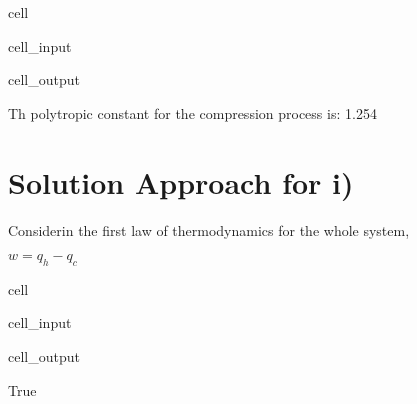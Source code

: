 \documentclass[letterpaper,10pt,english]{jupyterBook}
\begin{document}
\begin{sphinxuseclass}{cell}
\begin{sphinxVerbatimInput}
\begin{sphinxuseclass}{cell_input}
\end{sphinxuseclass}\end{sphinxVerbatimInput}
\begin{sphinxVerbatimOutput}

\begin{sphinxuseclass}{cell_output}
\begin{sphinxVerbatim}[commandchars=\\\{\}]
Th polytropic constant for the compression process is: 1.254
\end{sphinxVerbatim}

\end{sphinxuseclass}\end{sphinxVerbatimOutput}

\end{sphinxuseclass}

\section{Solution Approach for i)}
\label{\detokenize{notebooks/Chapter5/CH5-Q5:solution-approach-for-i}}
\sphinxAtStartPar
Considerin the first law of thermodynamics for the whole system,

\sphinxAtStartPar
\(w=q_h-q_c\)

\begin{sphinxuseclass}{cell}\begin{sphinxVerbatimInput}

\begin{sphinxuseclass}{cell_input}
\begin{sphinxVerbatim}[commandchars=\\\{\}]
     
   
\end{sphinxVerbatim}

\end{sphinxuseclass}\end{sphinxVerbatimInput}
\begin{sphinxVerbatimOutput}

\begin{sphinxuseclass}{cell_output}
\begin{sphinxVerbatim}[commandchars=\\\{\}]
True
\end{sphinxVerbatim}

\end{sphinxuseclass}\end{sphinxVerbatimOutput}

\end{sphinxuseclass}
\end{document}
